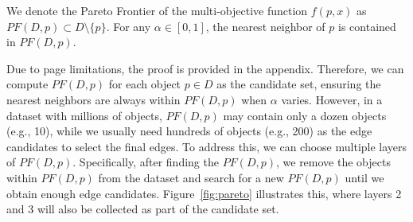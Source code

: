 \begin{theorem}
\label{theorem:nearest}
We denote the Pareto Frontier of the multi-objective function $f(p, x)$ as $PF(D, p) \subset D\setminus\{p\}$. For any $\alpha \in [0,1]$, %
the nearest neighbor of $p$ is contained in $PF(D, p)$. 
\end{theorem}
\vspace*{-0.5em}
Due to page limitations, the proof is provided in the appendix. Therefore, we can compute $PF(D, p)$ for each object $p \in D$ as the 
candidate set, ensuring the nearest neighbors are always within $PF(D, p)$ when $\alpha$ varies. However, in a dataset with millions of objects, $PF(D, p)$ may contain only a dozen objects (e.g., 10), while we usually need hundreds of objects (e.g., 200) as the edge candidates to select the final edges. To address this, we can choose multiple layers of $PF(D, p)$. Specifically, after finding the $PF(D, p)$, we remove the objects within $PF(D, p)$ from the dataset and search for a new $PF(D, p)$ until we obtain enough edge candidates. %
Figure~\ref{fig:pareto} illustrates this, where layers 2 and 3 will also be collected as part of the candidate set.

